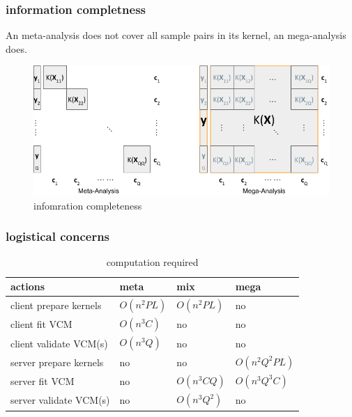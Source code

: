 \documentclass{beamer}
\begin{document}
\begin{frame}\frametitle{information completness}
  An meta-analysis does not cover all sample pairs in its kernel, an
  mega-analysis does.
  \begin{figure}
    \centering \includegraphics[width=.9\textwidth]{img/meta-mega}
    \caption{infomration completeness}
    \label{fig:info_comp}
  \end{figure}
\end{frame}
\begin{frame}\frametitle{logistical concerns}
  \begin{table}[h]
    \label{tb:cost}
    \begin{tabular}{|l|l|l|l|}
      \hline
      \textbf{actions}       & \textbf{meta} & \textbf{mix}  & \textbf{mega} \\ \hline
      client prepare kernels & $O(n^2PL)$    & $O(n^2PL)$    & no            \\ \hline
      client fit VCM         & $O(n^3C)$     & no            & no            \\ \hline
      client validate VCM(s) & $O(n^3Q)$     & no            & no            \\ \hline
      server prepare kernels & no            & no            & $O(n^2Q^2PL)$ \\ \hline
      server fit VCM         & no            & $O(n^3CQ)$    & $O(n^3Q^3C)$  \\ \hline
      server validate VCM(s) & no            & $O(n^3Q^2)$   & no            \\ \hline
    \end{tabular}
    \caption{computation required}
  \end{table}
\end{frame}
\end{document}
